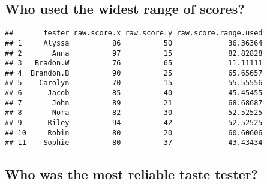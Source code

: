 \documentclass[
]{article}
\newenvironment{Shaded}{\begin{snugshade}}{\end{snugshade}}
\newcommand{\AttributeTok}[1]{\textcolor[rgb]{0.77,0.63,0.00}{#1}}
\newcommand{\CommentTok}[1]{\textcolor[rgb]{0.56,0.35,0.01}{\textit{#1}}}
\newcommand{\DecValTok}[1]{\textcolor[rgb]{0.00,0.00,0.81}{#1}}
\newcommand{\FunctionTok}[1]{\textcolor[rgb]{0.00,0.00,0.00}{#1}}
\newcommand{\NormalTok}[1]{#1}
\newcommand{\OtherTok}[1]{\textcolor[rgb]{0.56,0.35,0.01}{#1}}
\newcommand{\SpecialCharTok}[1]{\textcolor[rgb]{0.00,0.00,0.00}{#1}}
\newcommand{\StringTok}[1]{\textcolor[rgb]{0.31,0.60,0.02}{#1}}
\begin{document}
\hypertarget{who-used-the-widest-range-of-scores}{%
\subsection{Who used the widest range of
scores?}\label{who-used-the-widest-range-of-scores}}

\begin{Shaded}
\end{Shaded}

\begin{verbatim}
##       tester raw.score.x raw.score.y raw.score.range.used
## 1     Alyssa          86          50             36.36364
## 2       Anna          97          15             82.82828
## 3   Bradon.W          76          65             11.11111
## 4  Brandon.B          90          25             65.65657
## 5    Carolyn          70          15             55.55556
## 6      Jacob          85          40             45.45455
## 7       John          89          21             68.68687
## 8       Nora          82          30             52.52525
## 9      Riley          94          42             52.52525
## 10     Robin          80          20             60.60606
## 11    Sophie          80          37             43.43434
\end{verbatim}

\hypertarget{who-was-the-most-reliable-taste-tester}{%
\subsection{Who was the most reliable taste
tester?}\label{who-was-the-most-reliable-taste-tester}}
\end{document}
